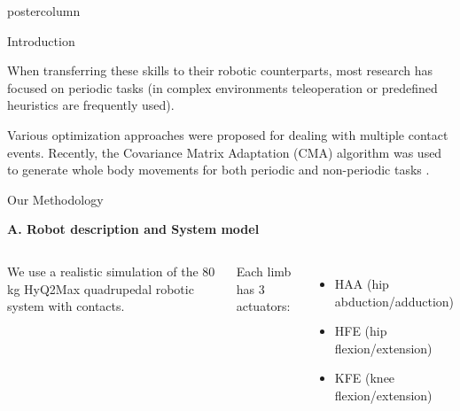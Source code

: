 \documentclass{beamer}
\begin{document}
\begin{frame}
\begin{columns}
\begin{column}{.29\textwidth}
\begin{beamercolorbox}[center]{postercolumn}
\begin{minipage}{.98\textwidth}
{\begin{myblock}{Introduction}
\begin{center}
\end{center} 
\vspace*{3mm}

When transferring these skills to their robotic counterparts,
most research has focused on periodic tasks (in complex environments
teleoperation or predefined heuristics are frequently used).
\vspace*{5mm}

Various optimization approaches were proposed for dealing with multiple contact events. 
Recently, the Covariance Matrix Adaptation (CMA) algorithm \cite{hansen2001completely} 
was used to generate whole body movements for both periodic and non-periodic tasks \cite{shafii2015learning,
gehring2016practice}.
\end{myblock}


\begin{myblock}{Our Methodology}
\vspace*{5mm}

\begin{center}
 \textbf{A. Robot description and System model}\\
\end{center}

\begin{columns}
We use a realistic simulation of the 80 kg HyQ2Max \cite{semini16tmech} 
quadrupedal robotic system with contacts. 

Each limb has 3 actuators:\\
\begin{itemize}
 \item HAA (hip abduction/adduction)
 \item HFE (hip flexion/extension)
 \item KFE (knee flexion/extension)
\end{itemize}


\end{columns}
\end{myblock}}
\end{minipage}
\end{beamercolorbox}
\end{column}
\end{columns}
\end{frame}
\end{document}
